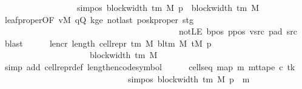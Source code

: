 \begin{isabellebody}
\ \ \ \ \ \ \ \ \ \ \ \ \ \ \ \ \ \ sim{\isacharunderscore}{\kern0pt}pos\ {\isacharparenleft}{\kern0pt}block{\isacharunderscore}{\kern0pt}width\ {\isacharparenleft}{\kern0pt}{\isasymGamma}{\isacharunderscore}{\kern0pt}tm\ M{\isacharparenright}{\kern0pt}{\isacharparenright}{\kern0pt}\ p\ {\isacharplus}{\kern0pt}\ block{\isacharunderscore}{\kern0pt}width\ {\isacharparenleft}{\kern0pt}{\isasymGamma}{\isacharunderscore}{\kern0pt}tm\ M{\isacharparenright}{\kern0pt}{\isacharparenright}{\kern0pt}{\isachardoublequoteclose}\isanewline
\ \ \ \ \ \ \isamarkupfalse%
\ leaf{\isacharunderscore}{\kern0pt}proper{\isacharbrackleft}{\kern0pt}OF\ vM\ qQ\ kge{}\ notlast\ posk{\isacharunderscore}{\kern0pt}proper\ stg\isanewline
\ \ \ \ \ \ \ \ \ \ \ \ \ \ \ \ \ \ \ \ \ \ \ \ \ \ \ \ \ \ \ \ \ \ \ \ \ \ \ \ \ \ notLE\ bpos\ ppos\ vsrc\ pad{}\ src{}{\isacharbrackright}{\kern0pt}\ \isamarkupfalse%
\ blast\isanewline
\ \ \ \ \isamarkupfalse%
\ len{\isacharunderscore}{\kern0pt}cr{\isacharcolon}{\kern0pt}\ {\isachardoublequoteopen}length\ {\isacharparenleft}{\kern0pt}cell{\isacharunderscore}{\kern0pt}repr\ {\isacharparenleft}{\kern0pt}{\isasymGamma}{\isacharunderscore}{\kern0pt}tm\ M{\isacharparenright}{\kern0pt}\ {\isacharparenleft}{\kern0pt}bl{\isacharunderscore}{\kern0pt}tm\ M{\isacharparenright}{\kern0pt}\ {\isacharparenleft}{\kern0pt}tM\ p{\isacharparenright}{\kern0pt}{\isacharparenright}{\kern0pt}\isanewline
\ \ \ \ \ \ \ \ \ \ \ \ \ \ \ \ \ \ \ \ {\isacharequal}{\kern0pt}\ block{\isacharunderscore}{\kern0pt}width\ {\isacharparenleft}{\kern0pt}{\isasymGamma}{\isacharunderscore}{\kern0pt}tm\ M{\isacharparenright}{\kern0pt}{\isachardoublequoteclose}\isanewline
\ \ \ \ \ \ \isamarkupfalse%
\ {\isacharparenleft}{\kern0pt}simp\ add{\isacharcolon}{\kern0pt}\ cell{\isacharunderscore}{\kern0pt}repr{\isacharunderscore}{\kern0pt}def\ length{\isacharunderscore}{\kern0pt}encode{\isacharunderscore}{\kern0pt}symbol{\isacharparenright}{\kern0pt}\isanewline
\ \ \ \ \isamarkupfalse%
\ cells{\isacharunderscore}{\kern0pt}eq{\isacharcolon}{\kern0pt}\ {\isachardoublequoteopen}map\ {\isacharparenleft}{\kern0pt}{\isasymlambda}m{\isachardot}{\kern0pt}\ mt{\isacharunderscore}{\kern0pt}tape\ c{\isacharprime}{\kern0pt}\ tk\isanewline
\ \ \ \ \ \ \ \ \ \ \ \ \ \ \ \ \ \ \ \ \ \ \ \ \ \ \ \ \ \ {\isacharparenleft}{\kern0pt}sim{\isacharunderscore}{\kern0pt}pos\ {\isacharparenleft}{\kern0pt}block{\isacharunderscore}{\kern0pt}width\ {\isacharparenleft}{\kern0pt}{\isasymGamma}{\isacharunderscore}{\kern0pt}tm\ M{\isacharparenright}{\kern0pt}{\isacharparenright}{\kern0pt}\ p\ {\isacharplus}{\kern0pt}\ m{\isacharparenright}{\kern0pt}{\isacharparenright}{\kern0pt}\isanewline

\end{isabellebody}
